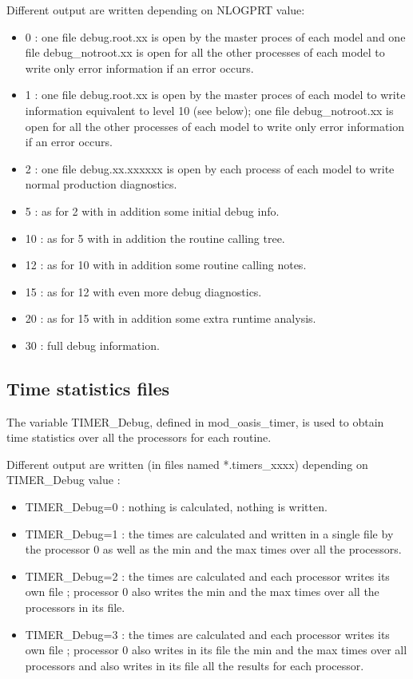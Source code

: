 Different output are written depending on NLOGPRT value:
\begin{itemize}
\item {0}  : one file debug.root.xx is open by the master proces of each model and one file debug\_notroot.xx is open for all the other processes of each model to write only error information if an error occurs.
\item {1}  : one file debug.root.xx is open by the master proces of each model to write information equivalent to level 10 (see below); one file debug\_notroot.xx is open for all the other processes of each model to write only error information if an error occurs.
\item {2}  : one file debug.xx.xxxxxx is open by each process of each model to write normal production diagnostics.
\item {5}  : as for 2 with in addition some initial debug info.
\item {10} : as for 5 with in addition the routine calling tree.
\item {12} : as for 10 with in addition some routine calling notes.
\item {15} : as for 12 with even more debug diagnostics.
\item {20} : as for 15 with in addition some extra runtime analysis.
\item {30} : full debug information.
\end{itemize}

\subsection{Time statistics files}

The variable TIMER\_Debug, defined in mod\_oasis\_timer, is used to obtain time statistics over all the processors for each routine.

Different output are written (in files named *.timers\_xxxx) depending on TIMER\_Debug value :

\begin{itemize}
\item {TIMER\_Debug=0} : nothing is calculated, nothing is written.
\item {TIMER\_Debug=1} : the times are calculated and written in a single file by the processor 0 as well as 
the min and the max times over all the processors.
\item {TIMER\_Debug=2} : the times are calculated and each processor writes its own file ; processor 0 also 
writes the min and the max times over all the processors in its file.
\item {TIMER\_Debug=3} : the times are calculated and each processor writes its own file ; processor 0 also 
writes in its file the min and the max times over all processors and also writes in its file all the results for each processor.
\end{itemize}


